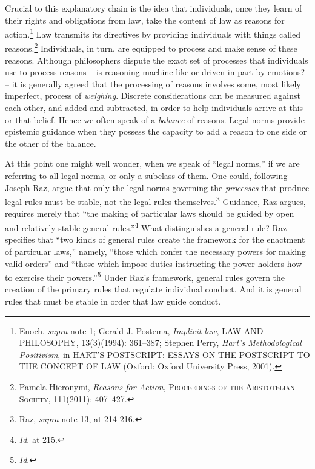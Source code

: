 Crucial to this explanatory chain is the idea that individuals, once
they learn of their rights and obligations from law, take the content of
law as reasons for action.\footnote{Enoch, \emph{supra} note 1; Gerald
  J. Postema, \emph{Implicit law}, LAW AND PHILOSOPHY, 13(3)(1994):
  361--387; Stephen Perry, \emph{Hart's Methodological Positivism}, in
  HART'S POSTSCRIPT: ESSAYS ON THE POSTSCRIPT TO THE CONCEPT OF LAW
  (Oxford: Oxford University Press, 2001).} Law transmits its directives
by providing individuals with things called reasons.\footnote{Pamela
  Hieronymi, \emph{Reasons for Action}, \textsc{Proceedings of the
  Aristotelian Society}, 111(2011): 407--427.} Individuals, in turn, are
equipped to process and make sense of these reasons. Although
philosophers dispute the exact set of processes that individuals use to
process reasons -- is reasoning machine-like or driven in part by
emotions? -- it is generally agreed that the processing of reasons
involves some, most likely imperfect, process of \emph{weighing}.
Discrete considerations can be measured against each other, and added
and subtracted, in order to help individuals arrive at this or that
belief. Hence we often speak of a \emph{balance} of reasons. Legal norms
provide epistemic guidance when they possess the capacity to add a
reason to one side or the other of the balance.

At this point one might well wonder, when we speak of ``legal norms,''
if we are referring to all legal norms, or only a subclass of them. One
could, following Joseph Raz, argue that only the legal norms governing
the \emph{processes} that produce legal rules must be stable, not the
legal rules themselves.\footnote{Raz, \emph{supra} note 13, at 214-216.}
Guidance, Raz argues, requires merely that ``the making of particular
laws should be guided by open and relatively stable general
rules.''\footnote{\emph{Id}. at 215.} What distinguishes a general rule?
Raz specifies that ``two kinds of general rules create the framework for
the enactment of particular laws,'' namely, ``those which confer the
necessary powers for making valid orders'' and ``those which impose
duties instructing the power-holders how to exercise their
powers.''\footnote{\emph{Id}.} Under Raz's framework, general rules
govern the creation of the primary rules that regulate individual
conduct. And it is general rules that must be stable in order that law
guide conduct.


